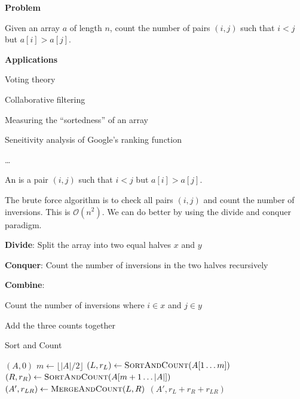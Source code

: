 \begin{listu}
    \item \textbf{Problem}
    
    Given an array $a$ of length $n$, count the number of pairs $(i, j)$ such that $i < j$ but $a[i] > a[j]$.

    \item \textbf{Applications}
    
    \begin{listu}
        \item Voting theory
        \item Collaborative filtering 
        \item Measuring the ``sortedness'' of an array
        \item Seneitivity analysis of Google's ranking function 
        \item \dots
    \end{listu}
\end{listu}

\begin{definition}[Inversion]
    An  is a pair $(i, j)$ such that $i < j$ but $a[i] > a[j]$.
\end{definition}

The brute force algorithm is to check all pairs $(i, j)$ and count the number of inversions. This is $\mathcal{O}(n^2)$. We can do better by using the divide and conquer paradigm.

\begin{listu}
    \item \textbf{Divide}: Split the array into two equal halves $x$ and $y$
    \item \textbf{Conquer}: Count the number of inversions in the two halves recursively
    \item \textbf{Combine}:
    \begin{listu}
        \item Count the number of inversions where $i \in x$ and $j \in y$
        \item Add the three counts together
    \end{listu}
\end{listu}

\begin{algorithm}
    \caption{Sort and Count}

    \begin{algorithmic}[1]
                \State \Return $(A, 0)$
            \EndIf
            \State $m \gets \lfloor |A| / 2 \rfloor$
            \State $(L, r_L) \gets \Call{SortAndCount}{A[1 \dots m]}$
            \State $(R, r_R) \gets \Call{SortAndCount}{A[m+1 \dots |A|]}$
            \State $(A', r_{LR}) \gets \Call{MergeAndCount}{L, R}$
            \State \Return $(A', r_L + r_R + r_{LR})$
        \EndFunction
    \end{algorithmic}
\end{algorithm}

